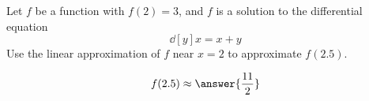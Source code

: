 \documentclass{ximera}
\author{Steven Gubkin}
\begin{document}
\begin{exercise}

Let $f$ be a function with $f(2) = 3$, and $f$ is a solution to the
differential equation
\[
\dd[y]{x} = x+y
\]
Use the linear approximation of $f$ near $x=2$ to approximate $f(2.5)$. 
\begin{prompt}
  \[
  f(2.5) \approx \answer{\frac{11}{2}}
  \]
\end{prompt}

\end{exercise}
\end{document}
